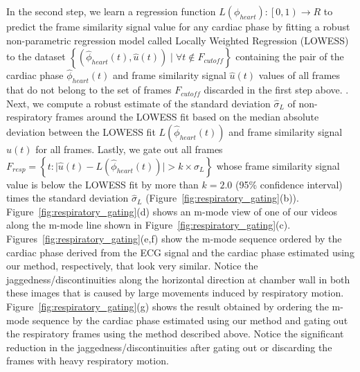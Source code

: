 \documentclass[journal]{IEEEtran}
\newcommand{\rk}[1]{{\color{blue}{#1}}}
\begin{document}
In the second step, we learn a regression function $L(\phi_{heart}) : \left [  0, 1\right ) \to R$ to predict the frame similarity signal value for any cardiac phase by fitting a robust non-parametric regression model called Locally Weighted Regression (LOWESS)~\cite{Cleveland1988} to the dataset $\left \{ \left(\hat{\phi}_{heart}(t), \hat{u}(t) \right) \mid \forall t \notin F_{cutoff}  \right \}$ containing the pair of the cardiac phase $\hat{\phi}_{heart}(t)$ and frame similarity signal $\hat{u}(t)$  values of all frames that do not belong to the set of frames $F_{cutoff}$ discarded in the first step above. \rk{Given any cardiac phase, LOWESS regression takes k-nearest training samples based on their cardiac phase values and uses  iterative weighted linear regression to predict the corresponding frame similarity signal value. This local fitting approach enables LOWESS regression to model a much wider class of functions than is possible with parametric approaches such as polynomial regression}. Next, we compute a robust estimate of the standard deviation $\hat{\sigma}_{L}$ of non-respiratory frames around the LOWESS fit based on the median absolute deviation between the LOWESS fit $L( \hat{\phi}_{heart}(t) )$ and frame similarity signal $\hat{u}(t)$ for all frames. Lastly, we gate out all frames $F_{resp} = \left \{ t : \lvert \hat{u}(t) - L( \hat{\phi}_{heart}(t) ) \rvert   > k \times \hat{\sigma}_{L}  \right \}$ whose frame similarity signal value is below the LOWESS fit by more than $k = 2.0$ (95\% confidence interval) times the standard deviation $\hat{\sigma}_{L}$ (Figure~\ref{fig:respiratory_gating}(b)). Figure~\ref{fig:respiratory_gating}(d) shows an m-mode view of one of our videos along the m-mode line shown in Figure~\ref{fig:respiratory_gating}(c). Figures~\ref{fig:respiratory_gating}(e,f) show the m-mode sequence ordered by the cardiac phase derived from the ECG signal and the cardiac phase estimated using our method, respectively, that look very similar. Notice the jaggedness/discontinuities along the horizontal direction at chamber wall in both these images that is caused by large movements induced by respiratory motion. Figure~\ref{fig:respiratory_gating}(g) shows the result obtained by ordering the m-mode sequence by the cardiac phase estimated using our method and gating out the respiratory frames using the method described above. Notice the significant reduction in the jaggedness/discontinuities after gating out or discarding the frames with heavy respiratory motion.
%
\vspace{-0.3cm}
\end{document}
